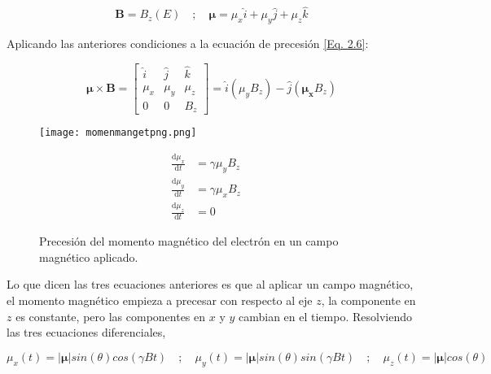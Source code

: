 \documentclass[11pt,fleqn]{book}
\renewcommand{\vec}[1]{\mathbf{#1}}
\begin{document}
\begin{example}
\begin{equation*}
      \vec{B}=B_{z}(E) \quad ;\quad \vec{\mu}=\mu_{x}\hat{i}+\mu_{y}\hat{j}+\mu_{z}\hat{k}
\end{equation*}

Aplicando las anteriores condiciones a la ecuación de precesión \ref{Eq. 2.6}:

\begin{equation*}
    \vec{\mu}\times\vec{B}=\begin{bmatrix}
    \hat{i} & \hat{j} & \hat{k} \\ 
    \mu_{x} & \mu_{y} & \mu_{z} \\ 
    0 & 0 & B_{z}
    \end{bmatrix}=\hat{i}(\mu_{y}B_{z})-\hat{j}(\vec{\mu_{x}}B_{z})
\end{equation*}

\begin{figure}[H]
\begin{minipage}[c]{0.6\linewidth}
\centering
        \texttt{[image: momenmangetpng.png]}
    \caption{Precesión del momento magnético del electrón en un campo magnético aplicado.}
    \label{Fig. 2.4}
    \end{minipage}\hspace{5mm}
    \begin{minipage}[c]{0.4\linewidth}
   \begin{equation*}
   \begin{split}
          \frac{\mathrm{d}\mu_{x}}{\mathrm{d}t}&=\gamma\mu_{y}B_{z}\\
          \frac{\mathrm{d}\mu_{y}}{\mathrm{d}t}&=\gamma\mu_{x}B_{z}\quad\\
          \frac{\mathrm{d}\mu_{z}}{\mathrm{d}t}&=0
   \end{split}
\end{equation*}
\end{minipage}
\end{figure}
\vspace{-4mm}

Lo que dicen las tres ecuaciones anteriores es que al aplicar un campo magnético, el momento magnético empieza a precesar con respecto al eje $z$, la componente en $z$ es constante, pero las componentes en $x$ y $y$ cambian en el tiempo. Resolviendo las tres ecuaciones diferenciales,

\begin{equation*}
        \mu_{x}(t)=\left|\vec{\mu}\right|sin(\theta)cos(\gamma Bt)\quad;\quad\mu_{y}(t)=\left|\vec{\mu}\right|sin(\theta)sin(\gamma Bt)\quad;\quad\mu_{z}(t)=\left|\vec{\mu}\right|cos(\theta)
\end{equation*}


\end{example}
\end{document}

